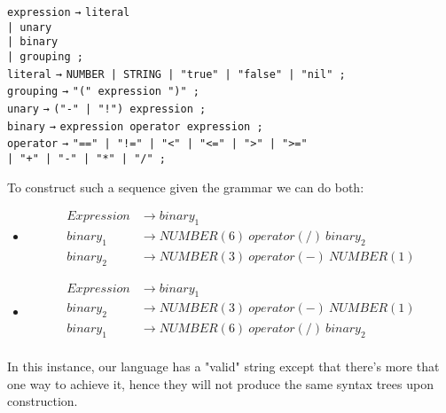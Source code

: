 \documentclass[12pt,a4paper]{article}
\newcommand{\newpar} {
  \vspace{1em}
  \noindent
}
\begin{document}
\begin{tabbing}
	\texttt{expression}  \quad \= \texttt{→} \= \texttt{literal} \\
	\>  \texttt{| unary} \\
	\>  \texttt{| binary} \\
	\>  \texttt{| grouping ;} \\[2mm]

	\texttt{literal} \> \texttt{→} \> \texttt{NUMBER | STRING | "true" | "false" | "nil" ;} \\
	\texttt{grouping} \> \texttt{→} \> \texttt{"(" expression ")" ;} \\
	\texttt{unary} \> \texttt{→} \> \texttt{("-" | "!") expression ;} \\
	\texttt{binary} \> \texttt{→} \> \texttt{expression operator expression ;} \\
	\texttt{operator} \> \texttt{→} \> \texttt{"==" | "!=" | "<" | "<=" | ">" | ">="} \\
	\> \texttt{| "+" | "-" | "*" | "/" ;}
\end{tabbing}

To construct such a sequence given the grammar we can do both:

\begin{itemize}
	\item
	      \begin{align}
		      Expression & \rightarrow binary_1                            \\
		      binary_1   & \rightarrow NUMBER(6) \ operator(/) \ binary_2  \\
		      binary_2   & \rightarrow NUMBER(3) \ operator(-) \ NUMBER(1)
	      \end{align}
	\item
	      \setcounter{equation}{0}
	      \begin{align}
		      Expression & \rightarrow binary_1                            \\
		      binary_2   & \rightarrow NUMBER(3) \ operator(-) \ NUMBER(1) \\
		      binary_1   & \rightarrow NUMBER(6) \ operator(/) \ binary_2  \\
	      \end{align}
\end{itemize}

\newpar
In this instance, our language has a "valid" string except that there's more that
one way to achieve it, hence they will not produce the same syntax trees upon construction.
\end{document}
